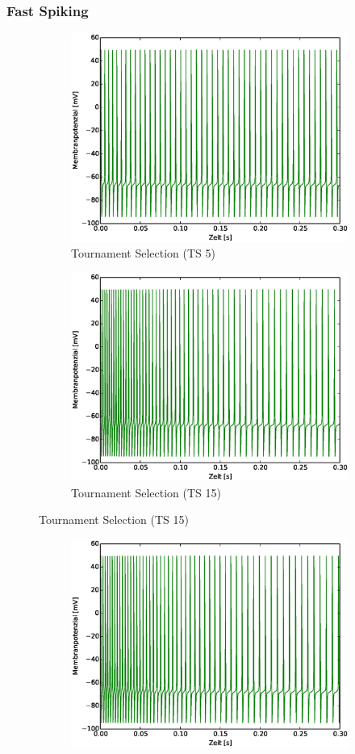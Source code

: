 \begin{frame}
  \frametitle{Fast Spiking}
  \begin{figure}
    \centering
    \begin{subfigure}{.5\textwidth}
      \centering
      \includegraphics*[viewport=19 10 532 394,width=0.7\linewidth]{genetic/fs-base.eps}
      \caption*{Tournament Selection (TS 5)}
    \end{subfigure}%
    \begin{subfigure}{.5\textwidth}
      \centering
      \includegraphics*[viewport=19 10 532 394,width=0.7\linewidth]{genetic/fs-tsize15.eps}
      \caption*{Tournament Selection (TS 15)}
    \end{subfigure}
  \end{figure}
  \begin{figure}
    \centering
    \begin{subfigure}{.5\textwidth}
      \centering
      \includegraphics*[viewport=19 10 532 394,width=0.7\linewidth]{genetic/fs-trunc-sel.eps}

\end{subfigure}
\end{figure}
\end{frame}
